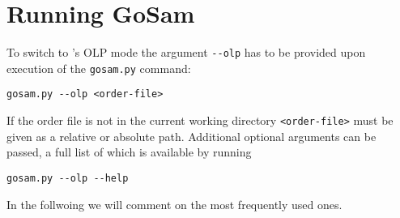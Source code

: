 \section{Running GoSam}\label{sec:BLHA_running}
To switch to \gosam's OLP mode the argument \lstinline[style=sh]|--olp| has to be provided upon execution of the \lstinline[style=sh]|gosam.py| command:
\begin{lstlisting}[style=sh]
gosam.py --olp <order-file>
\end{lstlisting}
If the order file is not in the current working directory \lstinline[style=sh]|<order-file>| must be given as a relative or absolute path. Additional optional arguments can be passed, a full list of which is available by running
\begin{lstlisting}[style=sh]
gosam.py --olp --help
\end{lstlisting}
In the follwoing we will comment on the most frequently used ones.
